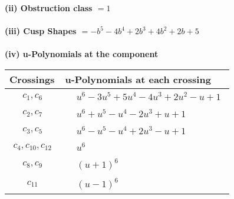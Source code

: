 \documentclass[1p]{elsarticle_modified}
\theoremstyle{definition}
\begin{document}
\flushleft \textbf{(ii) Obstruction class $= 1$}\\~\\
\flushleft \textbf{(iii) Cusp Shapes $= - b^5-4 b^4+2 b^3+4 b^2+2 b+5$}\\~\\
\newpage\renewcommand{\arraystretch}{1}
\flushleft \textbf{(iv) u-Polynomials at the component}\newline \\
\begin{tabular}{m{50pt}|m{274pt}}
Crossings & \hspace{64pt}u-Polynomials at each crossing \\
\hline $$\begin{aligned}c_{1},c_{6}\end{aligned}$$&$\begin{aligned}
&u^6-3 u^5+5 u^4-4 u^3+2 u^2- u+1
\end{aligned}$\\
\hline $$\begin{aligned}c_{2},c_{7}\end{aligned}$$&$\begin{aligned}
&u^6+u^5- u^4-2 u^3+u+1
\end{aligned}$\\
\hline $$\begin{aligned}c_{3},c_{5}\end{aligned}$$&$\begin{aligned}
&u^6- u^5- u^4+2 u^3- u+1
\end{aligned}$\\
\hline $$\begin{aligned}c_{4},c_{10},c_{12}\end{aligned}$$&$\begin{aligned}
&u^6
\end{aligned}$\\
\hline $$\begin{aligned}c_{8},c_{9}\end{aligned}$$&$\begin{aligned}
&(u+1)^6
\end{aligned}$\\
\hline $$\begin{aligned}c_{11}\end{aligned}$$&$\begin{aligned}
&(u-1)^6
\end{aligned}$\\
\hline
\end{tabular}\\~\\
\end{document}
